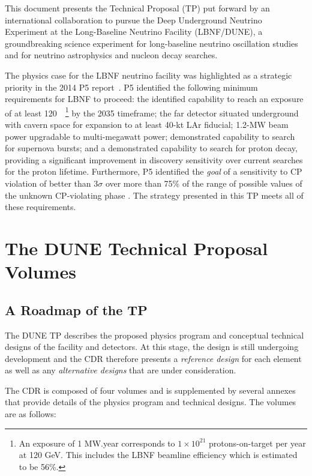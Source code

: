 This document presents %
the Technical Proposal (TP) put forward by an international collaboration to pursue 
the Deep Underground Neutrino Experiment at the Long-Baseline Neutrino Facility (LBNF/DUNE),
a groundbreaking science experiment for long-baseline neutrino oscillation studies and for neutrino astrophysics and nucleon decay searches. 

The physics case for the LBNF neutrino facility was highlighted as a strategic priority in the 2014 P5 report~\cite{p5report2014}.
P5 identified the following minimum requirements for LBNF to proceed: 
the identified capability to reach an exposure of at least 120~\ktMWyr{}~\footnote{An exposure
of 1 MW.year corresponds to $1\times 10^{21}$ protons-on-target per year at 120 GeV. This includes the LBNF beamline efficiency which is estimated to be 56\%.}  by the 2035 timeframe;
the far detector situated underground with cavern space for expansion to at least 40-kt LAr fiducial;
1.2-MW beam power upgradable to multi-megawatt power;
demonstrated capability to search for supernova bursts; and
a demonstrated capability to search for proton decay, 
providing a significant improvement in discovery sensitivity over current searches for the proton lifetime.
Furthermore, P5 identified  the \textit{goal} of a sensitivity to CP violation of better than 3$\sigma$ over more than 75\% 
of the range of possible values of the unknown CP-violating phase \deltacp.
The strategy presented in this TP meets all of these requirements.

\section{The DUNE Technical Proposal Volumes}

\subsection{A Roadmap of the TP}

The DUNE TP describes the proposed physics program and 
conceptual technical designs of the facility and detectors.  At this stage, the design is
still undergoing development and the CDR therefore presents a \textit{reference design} for each element as well as any 
\textit{alternative designs} that are under consideration.

The CDR is composed of four volumes and is supplemented
by several annexes that provide details of the physics program and technical designs. The volumes are as follows:

